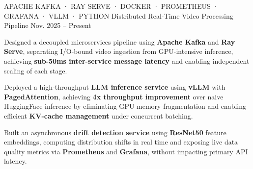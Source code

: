 \begin{cventries}
\cventry
    {APACHE KAFKA · RAY SERVE · DOCKER · PROMETHEUS · GRAFANA · VLLM · PYTHON} %
    {Distributed Real-Time Video Processing Pipeline} %
    {}
    {Nov. 2025 -- Present} %
    {
      \begin{cvitems}
        \item {Designed a decoupled microservices pipeline using \textbf{Apache Kafka} and \textbf{Ray Serve}, separating I/O-bound video ingestion from GPU-intensive inference, achieving \textbf{sub-50ms inter-service message latency} and enabling independent scaling of each stage.}
        \item {Deployed a high-throughput \textbf{LLM inference service} using \textbf{vLLM} with \textbf{PagedAttention}, achieving \textbf{4x throughput improvement} over naive HuggingFace inference by eliminating GPU memory fragmentation and enabling efficient \textbf{KV-cache management} under concurrent batching.}
        \item {Built an asynchronous \textbf{drift detection service} using \textbf{ResNet50} feature embeddings, computing distribution shifts in real time and exposing live data quality metrics via \textbf{Prometheus} and \textbf{Grafana}, without impacting primary API latency.} %
      \end{cvitems}
    }




\end{cventries}
